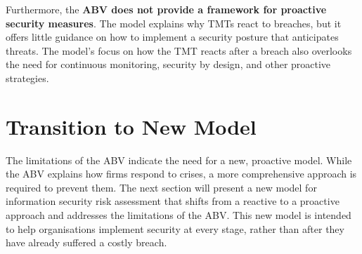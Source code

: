    Furthermore, the \textbf{ABV does not provide a framework for proactive security measures}. The model explains why TMTs react to breaches, but it offers little guidance on how to implement a security posture that anticipates threats. The model's focus on how the TMT reacts after a breach also overlooks the need for continuous monitoring, security by design, and other proactive strategies.

\section{Transition to New Model}
The limitations of the ABV indicate the need for a new, proactive model. While the ABV explains how firms respond to crises, a more comprehensive approach is required to prevent them. The next section will present a new model for information security risk assessment that shifts from a reactive to a proactive approach and addresses the limitations of the ABV. This new model is intended to help organisations implement security at every stage, rather than after they have already suffered a costly breach.